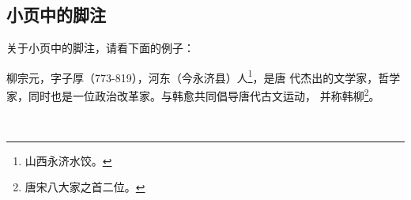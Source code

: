 
% 
% 

\subsection{小页中的脚注}

关于小页中的脚注，请看下面的例子：
 
\begin{minipage}[t]{\linewidth-2\parindent}
柳宗元，字子厚（773-819），河东（今永济县）人\footnote{山西永济水饺。}，是唐
代杰出的文学家，哲学家，同时也是一位政治改革家。与韩愈共同倡导唐代古文运动，
并称韩柳\footnote{唐宋八大家之首二位。}。
\end{minipage}\\[-5pt]

